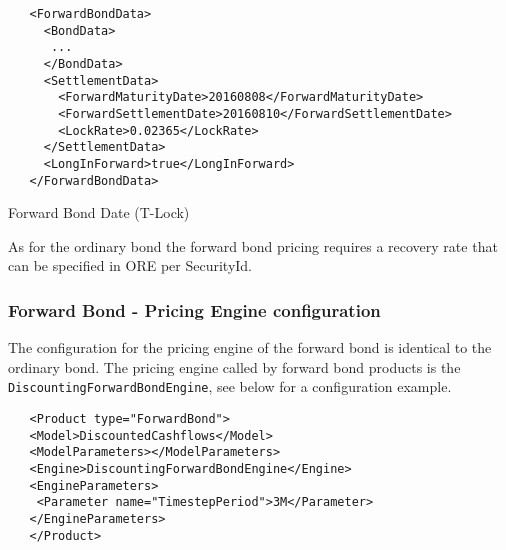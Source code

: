 \begin{listing}[H]
   \begin{verbatim}
   <ForwardBondData>
     <BondData>
      ...
     </BondData>
     <SettlementData>
       <ForwardMaturityDate>20160808</ForwardMaturityDate>
       <ForwardSettlementDate>20160810</ForwardSettlementDate>
       <LockRate>0.02365</LockRate>
     </SettlementData>
     <LongInForward>true</LongInForward>
   </ForwardBondData>
\end{verbatim}
\caption{Forward Bond Date (T-Lock)}
\label{lst:forward_bond_tlock}
\end{listing}

As for the ordinary bond the forward bond pricing requires a recovery rate that can be specified in ORE per SecurityId.

\subsubsection*{Forward Bond - Pricing Engine configuration}

The configuration for the pricing engine of the forward bond is identical to the ordinary bond.%
The pricing engine called by forward bond products is the {\tt DiscountingForwardBondEngine}, see below for a configuration example.

   \begin{verbatim}
   <Product type="ForwardBond">
   <Model>DiscountedCashflows</Model>
   <ModelParameters></ModelParameters>
   <Engine>DiscountingForwardBondEngine</Engine>
   <EngineParameters>
    <Parameter name="TimestepPeriod">3M</Parameter>
   </EngineParameters>
   </Product>
   \end{verbatim}
